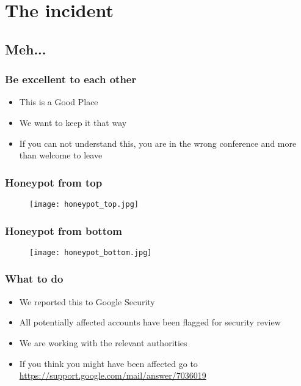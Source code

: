 \documentclass[t]{beamer}
\begin{document}
\section{The incident}

\subsection{Meh...}

\begin{frame}
	\frametitle{Be excellent to each other}
	\vfill
	\begin{itemize}
		\item This is a Good Place
		\item We want to keep it that way
		\item If you can not understand this, you are in the wrong conference and more than welcome to leave
	\end{itemize}
	\vfill
\end{frame}

\begin{frame}
	\frametitle{Honeypot from top}
	\vfill
	\begin{figure}[ht!]
		\texttt{[image: honeypot\_top.jpg]}
	\end{figure}
	\vfill
\end{frame}

\begin{frame}
	\frametitle{Honeypot from bottom}
	\vfill
	\begin{figure}[ht!]
		\texttt{[image: honeypot\_bottom.jpg]}
	\end{figure}
	\vfill
\end{frame}

\begin{frame}
	\frametitle{What to do}
	\vfill
	\begin{itemize}
		\item We reported this to Google Security
		\item All potentially affected accounts have been flagged for security review
		\item We are working with the relevant authorities
		\item If you think you might have been affected go to \url{https://support.google.com/mail/answer/7036019}
	\end{itemize}
	\vfill
\end{frame}
\end{document}

